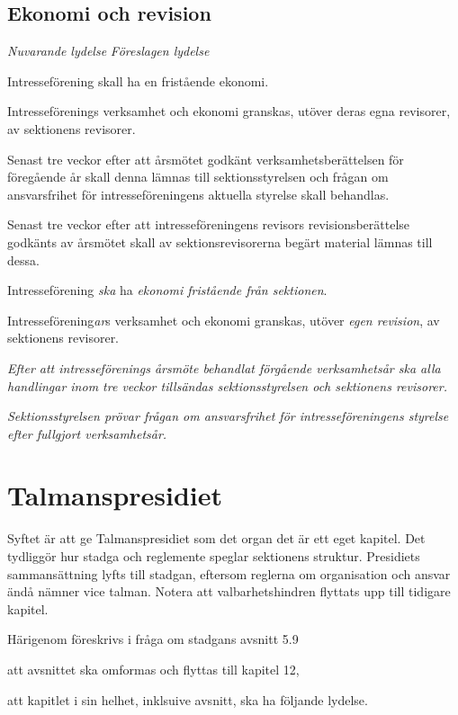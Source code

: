 \documentclass{article}
\newenvironment{lydelse}
    {\begin{paracol}{2}%
        \emph{Nuvarande lydelse}%
        \switchcolumn%
        \emph{Föreslagen lydelse}%
    \end{paracol}%
    \begin{enumerate}[label=\thesubsection.\arabic*]%
    \begin{paracol}{2}%
    }{\end{paracol}\end{enumerate}}
\begin{document}
\subsection{Ekonomi och revision}
\begin{lydelse}
  \setcounter{section}{12}
  \setcounter{subsection}{6}
  \item Intresseförening skall ha en fristående ekonomi.
  \item Intresseförenings verksamhet och ekonomi granskas, utöver deras egna revisorer, av sektionens revisorer.
  \item Senast tre veckor efter att årsmötet godkänt verksamhetsberättelsen för föregående år skall denna lämnas till sektionsstyrelsen och frågan om ansvarsfrihet för intresseföreningens aktuella styrelse skall behandlas.
  \item Senast tre veckor efter att intresseföreningens revisors revisionsberättelse godkänts av årsmötet skall av sektionsrevisorerna begärt material lämnas till dessa.
\switchcolumn
  \setcounter{section}{11}
  \item Intresseförening \emph{ska} ha \emph{ekonomi fristående från sektionen}.
  \item Intresseförening\emph{ar}s verksamhet och ekonomi granskas, utöver \emph{egen revision}, av sektionens revisorer.
  \item \emph{Efter att intresseförenings årsmöte behandlat förgående verksamhetsår ska alla handlingar inom tre veckor tillsändas sektionsstyrelsen och sektionens revisorer.}
  \item \emph{Sektionsstyrelsen prövar frågan om ansvarsfrihet för intresseföreningens styrelse efter fullgjort verksamhetsår.}
\end{lydelse}
\setcounter{section}{11}
\setcounter{subsection}{3}

\section{Talmanspresidiet}
Syftet är att ge Talmanspresidiet som det organ det är ett eget kapitel.
Det tydliggör hur stadga och reglemente speglar sektionens struktur.
Presidiets sammansättning lyfts till stadgan, eftersom reglerna om organisation och ansvar ändå nämner vice talman.
Notera att valbarhetshindren flyttats upp till tidigare kapitel.

Härigenom föreskrivs i fråga om stadgans avsnitt 5.9
\begin{dels}
  \item att avsnittet ska omformas och flyttas till kapitel 12,
  \item att kapitlet i sin helhet, inklsuive avsnitt, ska ha följande lydelse.
\end{dels}
\end{document}
